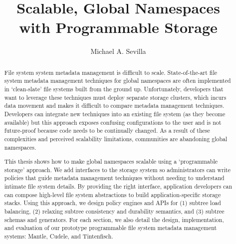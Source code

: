\title{Scalable, Global Namespaces\\with Programmable Storage}
\author{Michael A. Sevilla}
\deanlinethree{}

\begin{frontmatter}
	\maketitle\copyrightpage\tableofcontents\listoffigures\listoftables
	\begin{abstract}

File system system metadata management is difficult to scale. State-of-the-art
file system metadata management techniques for global namespaces are often
implemented in `clean-slate' file systems built from the ground up.
Unfortunately, developers that want to leverage these techniques must deploy
separate storage clusters, which incurs data movement and makes it difficult to
compare metadata management techniques. Developers can integrate new techniques
into an existing file system (as they become available) but this approach
exposes confusing configurations to the user and is not future-proof because
code needs to be continually changed. As a result of these complexities and
perceived scalability limitations, communities are abandoning global
namespaces.

This thesis shows how to make global namespaces scalable using a `programmable
storage' approach. We add interfaces to the storage system so administrators
can write policies that guide metadata management techniques without needing to
understand intimate file system details. By providing the right interface,
application developers can can compose high-level file system abstractions to
build application-specific storage stacks. Using this approach, we design
policy engines and APIs for (1) subtree load balancing, (2) relaxing subtree
consistency and durability semantics, and (3) subtree schemas and generators.
For each section, we also detail the design, implementation, and evaluation of
our prototype programmable file system metadata management systems: Mantle,
Cudele, and Tintenfisch.


\end{abstract}
\end{frontmatter}
